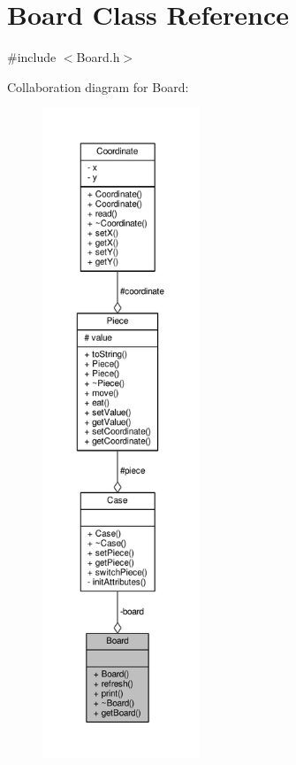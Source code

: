 \hypertarget{class_board}{}\section{Board Class Reference}
\label{class_board}


{\ttfamily \#include $<$Board.\+h$>$}



Collaboration diagram for Board\+:
\nopagebreak
\begin{figure}[H]
\begin{center}
\leavevmode
\includegraphics[height=550pt]{class_board__coll__graph}
\end{center}
\end{figure}
